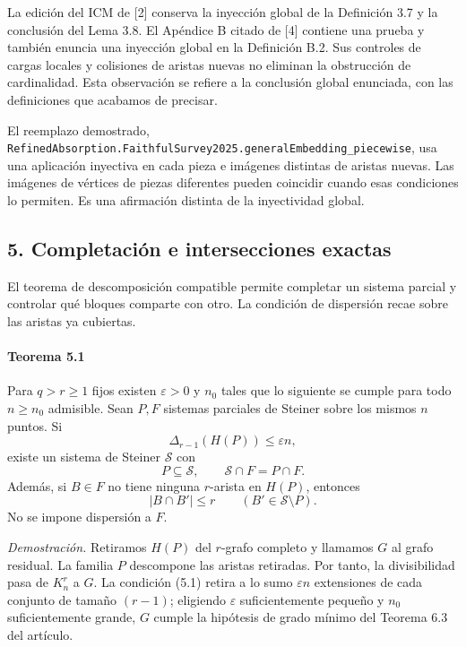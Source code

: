 \documentclass[spanish,11pt,a4paper]{article}
\begin{document}
La edición del ICM de {[}2{]} conserva la inyección global de la Definición 3.7 y la conclusión del Lema 3.8. El Apéndice B citado de {[}4{]} contiene una prueba y también enuncia una inyección global en la Definición B.2. Sus controles de cargas locales y colisiones de aristas nuevas no eliminan la obstrucción de cardinalidad. Esta observación se refiere a la conclusión global enunciada, con las definiciones que acabamos de precisar.

El reemplazo demostrado, \texttt{Refined\allowbreak{}Absorption.\allowbreak{}Faithful\allowbreak{}Survey2025.\allowbreak{}general\allowbreak{}Embedding\_\allowbreak{}piecewise}, usa una aplicación inyectiva en cada pieza e imágenes distintas de aristas nuevas. Las imágenes de vértices de piezas diferentes pueden coincidir cuando esas condiciones lo permiten. Es una afirmación distinta de la inyectividad global.

\subsection{5. Completación e intersecciones exactas}\label{completaciuxf3n-e-intersecciones-exactas}

El teorema de descomposición compatible permite completar un sistema parcial y controlar qué bloques comparte con otro. La condición de dispersión recae sobre las aristas ya cubiertas.

\par
\begin{samepage}
\paragraph{Teorema 5.1}\label{teorema-5.1}

Para \(q>r\ge1\) fijos existen \(\varepsilon>0\) y \(n_0\) tales que lo siguiente se cumple para todo \(n\ge n_0\) admisible. Sean \(P,F\) sistemas parciales de Steiner sobre los mismos \(n\) puntos. Si \[\Delta_{r-1}(H(P))\le\varepsilon n,
\tag{5.1}\] existe un sistema de Steiner \(\mathcal S\) con \[P\subseteq\mathcal S,\qquad
\mathcal S\cap F=P\cap F.
\tag{5.2}\] Además, si \(B\in F\) no tiene ninguna \(r\)-arista en \(H(P)\), entonces \[|B\cap B'|\le r
\qquad(B'\in\mathcal S\setminus P).
\tag{5.3}\] No se impone dispersión a \(F\).

\end{samepage}
\emph{Demostración.} Retiramos \(H(P)\) del \(r\)-grafo completo y llamamos \(G\) al grafo residual. La familia \(P\) descompone las aristas retiradas. Por tanto, la divisibilidad pasa de \(K_n^r\) a \(G\). La condición (5.1) retira a lo sumo \(\varepsilon n\) extensiones de cada conjunto de tamaño \((r-1)\); eligiendo \(\varepsilon\) suficientemente pequeño y \(n_0\) suficientemente grande, \(G\) cumple la hipótesis de grado mínimo del Teorema 6.3 del artículo.
\end{document}
